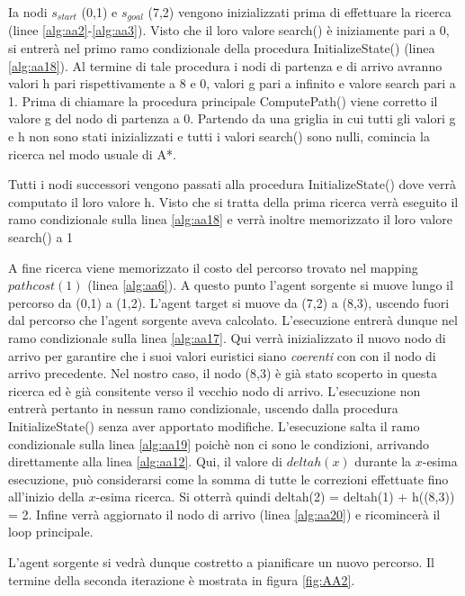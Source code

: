\documentclass[12pt]{book}
\begin{document}
\par{Ia nodi $s_{start}$ (0,1) e $s_{goal}$ (7,2) vengono inizializzati prima di effettuare la ricerca (linee \ref{alg:aa2}-\ref{alg:aa3}). Visto che il loro valore search() \`e iniziamente pari a 0, si entrer\`a nel primo ramo condizionale della procedura InitializeState() (linea \ref{alg:aa18}). Al termine di tale procedura i nodi di partenza e di arrivo avranno valori h pari rispettivamente a 8 e 0, valori g pari a infinito e valore search pari a 1. Prima di chiamare la procedura principale ComputePath() viene corretto il valore g del nodo di partenza a 0. Partendo da una griglia in cui tutti gli valori g e h non sono stati inizializzati e tutti i valori search() sono nulli, comincia la ricerca nel modo usuale di A*.}
\par{Tutti i nodi successori vengono passati alla procedura InitializeState() dove verr\`a computato il loro valore h. Visto che si tratta della prima ricerca verr\`a eseguito il ramo condizionale sulla linea \ref{alg:aa18} e verr\`a inoltre memorizzato il loro valore search() a 1}
\par{A fine ricerca viene memorizzato il costo del percorso trovato nel mapping $pathcost(1)$ (linea \ref{alg:aa6}). A questo punto l'agent sorgente si muove lungo il percorso da (0,1) a (1,2).
L'agent  target si muove da (7,2) a (8,3), uscendo fuori dal percorso che l'agent sorgente aveva calcolato. L'esecuzione entrer\`a dunque nel ramo condizionale sulla linea \ref{alg:aa17}. Qui verr\`a inizializzato il nuovo nodo di arrivo per garantire che i suoi valori euristici siano \emph{coerenti} con con il nodo di arrivo precedente. Nel nostro caso, il nodo (8,3) \`e gi\`a stato scoperto in questa ricerca ed \`e gi\`a consitente verso il vecchio nodo di arrivo. L'esecuzione non entrer\`a pertanto in nessun ramo condizionale, uscendo dalla procedura InitializeState() senza aver apportato modifiche. L'esecuzione salta il ramo condizionale sulla linea \ref{alg:aa19} poich\`e non ci sono le condizioni, arrivando direttamente alla linea \ref{alg:aa12}. Qui, il valore di $deltah(x)$ durante la $x$-esima esecuzione, pu\`o considerarsi come la somma di tutte le correzioni effettuate fino all'inizio della $x$-esima ricerca. Si otterr\`a quindi deltah(2) = deltah(1) + h((8,3)) = 2. Infine verr\`a aggiornato il nodo di arrivo (linea \ref{alg:aa20}) e ricomincer\`a il loop principale.}
\par{
L'agent sorgente si vedr\`a dunque costretto a pianificare un nuovo percorso. Il termine della seconda iterazione \`e mostrata in figura \ref{fig:AA2}.} 
\end{document}
